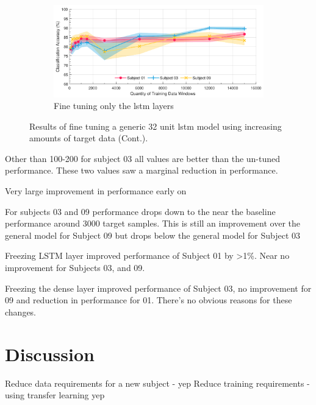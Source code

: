 \begin{figure}[t]\ContinuedFloat
    \begin{subfigure}{\textwidth}
        \centering
        \includegraphics[width=\textwidth]{content/5-Personalisation/ch5_frozen_dense_layer_accuracy.pdf}
        \caption{Fine tuning only the \acrshort{lstm} layers}
    \end{subfigure}
    \caption[]{Results of fine tuning a generic 32 unit \acrshort{lstm} model using increasing amounts of target data (Cont.).}
\end{figure}

Other than 100-200 for subject 03 all values are better than the un-tuned performance. These two values saw a marginal reduction in performance.

Very large improvement in performance early on

For subjects 03 and 09 performance drops down to the near the baseline performance around 3000 target samples. This is still an improvement over the general model for Subject 09 but drops below the general model for Subject 03

Freezing LSTM layer improved performance of Subject 01 by >1\%. Near no improvement for Subjects 03, and 09.

Freezing the dense layer improved performance of Subject 03, no improvement for 09 and reduction in performance for 01. There's no obvious reasons for these changes.


\section{Discussion}
\label{sec:personalisation-discussion}
Reduce data requirements for a new subject - yep
Reduce training requirements - using transfer learning yep

